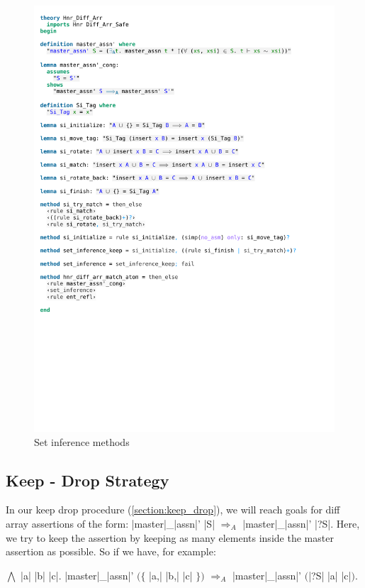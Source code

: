\begin{figure}[htpb]
    \includegraphics[trim={0 9,2cm 0 13,6cm}, clip, width=1.00\textwidth]{figures/Theory_Hnr_Diff_Arr_SI.pdf}
    \caption[Set inference methods]{Set inference methods}
    \label{fig:si_methods}
\end{figure}

\subsection{Keep - Drop Strategy}

\begin{samepage}
In our keep drop procedure (\autoref{section:keep_drop}), we will reach goals for diff array assertions of the form: |master|\_|assn|' |S| $\Longrightarrow_A$ |master|\_|assn|' |?S|. Here, we try to keep the assertion by keeping as many elements inside the master assertion as possible. So if we have, for example:\nopagebreak


\noindent$\bigwedge$ |a| |b| |c|. |master|\_|assn|' $(\{$ |a,| |b,| |c| $\})$ $\Longrightarrow_A$ |master|\_|assn|' $($|?S| |a| |c|$)$.
\end{samepage}

